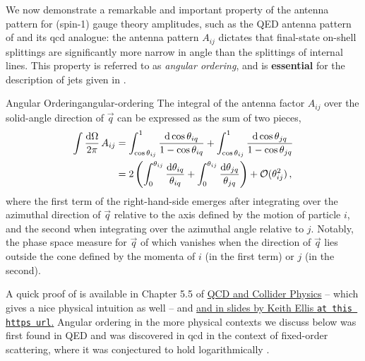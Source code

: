 We now demonstrate a remarkable and important property of the antenna pattern for (spin-1) gauge theory amplitudes, such as the QED antenna pattern of  and its \gls{qcd} analogue:
%
the antenna pattern \(A_{ij}\) dictates that final-state on-shell splittings are significantly more narrow in angle than the splittings of internal lines.
%
This property is referred to as \textit{angular ordering}, and is \textbf{essential} for the description of jets given in .


\begin{lemma}{Angular Ordering}{angular-ordering}
    The integral of the antenna factor \(A_{ij}\) over the solid-angle direction of \(\vec{q}\) can be expressed as the sum of two pieces,
    \begin{align}
        \label{eq:angular-ordering-integral}
        \int \frac{\dd \Omega}{2\pi}\, A_{ij}
        &=
        \int_{\cos\theta_{ij}}^{1}
        \frac{\dd \cos\theta_{iq}}{1-\cos\theta_{iq}}
        +
        \int_{\cos\theta_{ij}}^{1}
        \frac{\dd \cos\theta_{jq}}{1-\cos\theta_{jq}}
        \\
        &=
        2
        \le(
            \int_{0}^{\theta_{ij}}
            \frac{\dd \theta_{iq}}{\theta_{iq}}
            +
            \int_{0}^{\theta_{ij}}
            \frac{\dd \theta_{jq}}{\theta_{jq}}
        \ri)
        +
        \mathcal{O}(\theta_{ij}^2)
        \,,
    \end{align}
    where the first term of the right-hand-side emerges after integrating over the azimuthal direction of \(\vec{q}\) relative to the axis defined by the motion of particle \(i\), and the second when integrating over the azimuthal angle relative to \(j\).
    Notably, the phase space measure for \(\vec{q}\) of which vanishes when the direction of \(\vec{q}\) lies outside the cone defined by the momenta of \(i\) (in the first term) or \(j\) (in the second).
\end{lemma}

A quick proof of  is available in Chapter 5.5 of \underline{QCD and Collider Physics} \cite{Ellis:1996mzs} -- which gives a nice physical intuition as well -- and \href{https://indico.ictp.it/event/a12185/session/36/contribution/26/material/0/0.pdf\#page=34}{and in slides by Keith Ellis \texttt{at this https url}.}
%
Angular ordering in the more physical contexts we discuss below was first found in QED \cite{osti_4367332} and was discovered in \gls{qcd} in the context of fixed-order scattering, where it was conjectured to hold logarithmically \cite{Mueller:1981ex}.


